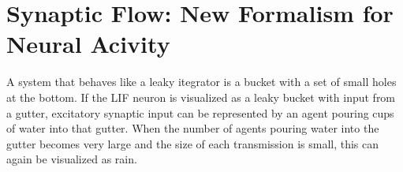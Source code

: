 


\section{Synaptic Flow: New Formalism for Neural Acivity} %
	\label{secDevelopmentOfTheNovelANNmodel}
	A system that behaves like a leaky itegrator is a bucket with a set of small holes at the bottom.
	If the LIF neuron is visualized as a leaky bucket with input from a gutter, excitatory synaptic input can be represented by an agent pouring cups of water into that gutter.
	When the number of agents pouring water into the gutter becomes very large and the size of each transmission is small, this can again be visualized as rain.

